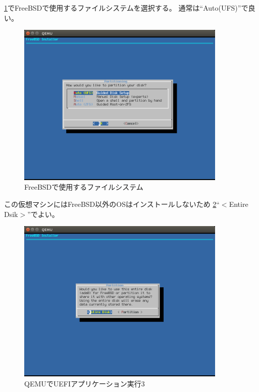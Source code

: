 \documentclass[a4j]{jarticle}
\begin{document}
\begin{multicols}{2}
\ref{fig:FreeBSD_FS}でFreeBSDで使用するファイルシステムを選択する。
通常は``Auto(UFS)''で良い。
\begin{figure}[htbp]
	\begin{center}
    	\includegraphics[width=10cm]{./IMG/FreeBSD_AUTO.png}
	\end{center}
    \caption{FreeBSDで使用するファイルシステム}
    \label{fig:FreeBSD_FS}
\end{figure}

この仮想マシンにはFreeBSD以外のOSはインストールしないため
\ref{fig:FreeBSD_Q}``$<$Entire Dsik$>$''でよい。
\begin{figure}[htbp]
	\begin{center}
    	\includegraphics[width=10cm]{./IMG/FreeBSD_ENTRY.png}
	\end{center}
    \caption{QEMUでUEFIアプリケーション実行3}
    \label{fig:FreeBSD_Q}
\end{figure}


\end{multicols}
\end{document}
